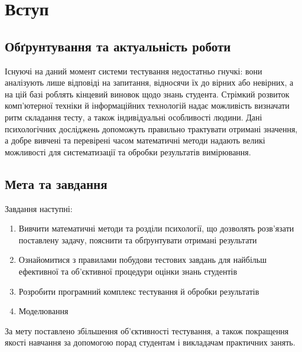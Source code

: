 \chapter{Вступ}
\section{Обґрунтування та актуальність роботи}
Існуючі на даний момент системи тестування недостатньо гнучкі: вони
аналізують лише відповіді на запитання, відносячи їх до вірних або невірних,
а на цій базі роблять кінцевий виновок щодо знань студента.
Стрімкий розвиток комп’ютерної техніки й інформаційних технологій надає
можливість визначати ритм складання тесту, а також індивідуальні особливості
людини.
Дані психологічних досліджень допоможуть правильно трактувати отримані
значення, а добре вивчені та перевірені часом математичні методи надають
великі можливості для систематизації та обробки результатів вимірювання.

\section{Мета та завдання}
Завдання наступні:
\begin{enumerate}
  \item
    Вивчити математичні методи та розділи психології, що дозволять розв’язати
    поставлену задачу, пояснити та обґрунтувати отримані результати
  \item
    Ознайомитися з правилами побудови тестових завдань для найбільш
    ефективної та об’єктивної процедури оцінки знань студентів
  \item
    Розробити програмний комплекс тестування й обробки результатів
  \item
    Моделювання
\end{enumerate}

За мету поставлено збільшення об’єктивності тестування, а також покращення
якості навчання за допомогою порад студентам і викладачам практичних занять.
